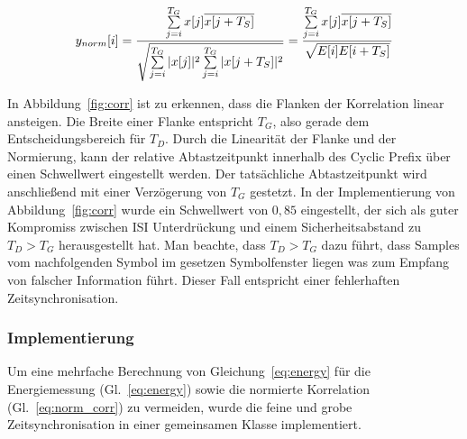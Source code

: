 \begin{equation}
    y_{norm}[i] = \frac{\sum \limits_{j=i}^{T_G}x[j] \overline{x[j+T_S]}}{\sqrt{\sum \limits_{j=i}^{T_G}|x[j]|^2 \sum \limits_{j=i}^{T_G}|x[j+T_S]|^2}} = \frac{\sum \limits_{j=i}^{T_G}x[j]     \overline{x[j+T_S]}}{\sqrt{E[i]E[i+T_S]}}
    \label{eq:norm_corr}
\end{equation}

In Abbildung~\ref{fig:corr} ist zu erkennen, dass die Flanken der Korrelation linear ansteigen. Die Breite einer Flanke entspricht $T_G$, also gerade dem Entscheidungsbereich für $T_D$. Durch die Linearität der Flanke und der Normierung, kann der relative Abtastzeitpunkt innerhalb des Cyclic Prefix über einen Schwellwert eingestellt werden. Der tatsächliche Abtastzeitpunkt wird anschließend mit einer Verzögerung von $T_G$ gestetzt. In der Implementierung von Abbildung~\ref{fig:corr} wurde ein Schwellwert von $0,85$ eingestellt, der sich als guter Kompromiss zwischen \ac{ISI} Unterdrückung und einem Sicherheitsabstand zu $T_D > T_G$ herausgestellt hat. Man beachte, dass $T_D > T_G$ dazu führt, dass Samples vom nachfolgenden Symbol im gesetzen Symbolfenster liegen was zum Empfang von falscher Information führt. Dieser Fall entspricht einer fehlerhaften Zeitsynchronisation.

\subsubsection{Implementierung}
Um eine mehrfache Berechnung von Gleichung~\ref{eq:energy} für die Energiemessung (Gl.~\ref{eq:energy}) sowie die normierte Korrelation (Gl.~\ref{eq:norm_corr}) zu vermeiden, wurde die feine und grobe Zeitsynchronisation in einer gemeinsamen Klasse implementiert.

